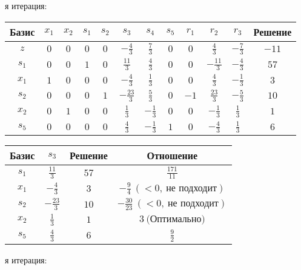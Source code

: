 \documentclass{article}%
\begin{document}
\begin{flushleft}
\newline%
\newline%
я итерация: %
\newline%
\newline%
\renewcommand{\arraystretch}{1.3}%
\begin{tabular}{|c|cccccccccc|c|}%
\hline%
Базис&$x_{1}$&$x_{2}$&$s_{1}$&$s_{2}$&$s_{3}$&$s_{4}$&$s_{5}$&$r_{1}$&$r_{2}$&$r_{3}$&Решение\\%
\hline%
$z$&$0$&$0$&$0$&$0$&$-\frac{4}{3}$&$\frac{7}{3}$&$0$&$0$&$\frac{4}{3}$&$-\frac{7}{3}$&$-11$\\%
\hline%
$s_{1}$&$0$&$0$&$1$&$0$&$\frac{11}{3}$&$\frac{4}{3}$&$0$&$0$&$-\frac{11}{3}$&$-\frac{4}{3}$&$57$\\%
$x_{1}$&$1$&$0$&$0$&$0$&$-\frac{4}{3}$&$\frac{1}{3}$&$0$&$0$&$\frac{4}{3}$&$-\frac{1}{3}$&$3$\\%
$s_{2}$&$0$&$0$&$0$&$1$&$-\frac{23}{3}$&$\frac{5}{3}$&$0$&$-1$&$\frac{23}{3}$&$-\frac{5}{3}$&$10$\\%
$x_{2}$&$0$&$1$&$0$&$0$&$\frac{1}{3}$&$-\frac{1}{3}$&$0$&$0$&$-\frac{1}{3}$&$\frac{1}{3}$&$1$\\%
$s_{5}$&$0$&$0$&$0$&$0$&$\frac{4}{3}$&$-\frac{1}{3}$&$1$&$0$&$-\frac{4}{3}$&$\frac{1}{3}$&$6$\\%
\hline%
\end{tabular}%
\newline%
\newline%
\newline%
\begin{tabular}{|cccc|}%
\hline%
Базис&$s_{3}$&Решение&Отношение\\%
\hline%
$s_{1}$&$\frac{11}{3}$&$57$&$\frac{171}{11}$\\%
$x_{1}$&$-\frac{4}{3}$&$3$&$-\frac{9}{4}\: (< 0, \: \text{не подходит})$\\%
$s_{2}$&$-\frac{23}{3}$&$10$&$-\frac{30}{23}\: (< 0, \: \text{не подходит})$\\%
$x_{2}$&$\frac{1}{3}$&$1$&$3\: \text{(Оптимально)}$\\%
$s_{5}$&$\frac{4}{3}$&$6$&$\frac{9}{2}$\\%
\hline%
\end{tabular}%
\newline%
\newline%
я итерация: %
\newline%
\newline%
\renewcommand{\arraystretch}{1.3}%

\end{flushleft}
\end{document}
